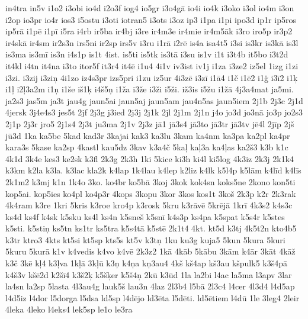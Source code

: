 {{in4tra in5v i1o2 i3obi io4d i2o3f iog4 io5gr i3o4g\={a} io4i io4k
i3oko i3ol io4m i3on i2op io3pr io4r ios3 i5ostu i3oti iotran5 i3ots
i3oz ip3 i1pa i1pi ipo3d ip1r ip5ros ip5r\={a} i1p\={e} i1p\={i}
i5ra i4rb ir5ba ir4bj i3re ir4m3e ir4mie ir4m5\={a}k i3ro iro5p
ir3p2 ir4sk\={a} ir4sm ir2s3n irs5ni ir2sp irs5v i3ru i1r\={a} i2r\={e}
is4a isa4t5 i3si is3kr is3k\={a} is3l is3ma is3m\={i} is3n i4s1p
is1t 4ist. is5ti is5tk is3t\={a} i3su is1v i1t i3t4b it5bo i3t2d it4kl
i4tn it4na i3to itor5f it3r4 it4\={e} i1u4 4i1v iv3ist iv1j i1za i3ze2
iz5el 1izg i1zi i3zi. i3zij i3zi\c{n} 4i1zo iz4s3pr izs5pri i1zu
iz5ur 4i3z\={e} i3z\={i} i1\={a}4 i1\v{c} i1\={e}2 i1\c{g} i3\={i}2
i1\c{k} i1\c{l} i2\c{l}3a2m i1\c{n} i1\v{s}e i\v{s}1\c{k}
i4\v{s}5\c{n} i1\v{z}a i3\v{z}e i3\v{z}i i5\v{z}i. i\v{z}3is
i5\v{z}u i1\v{z}\={a} 4j3a4mat ja5mi. ja2s3 jas5m ja3t jau4g
jaun5ai jaun5aj jaun5am jau4n5as jaun5iem 2j1b 2j3c 2j1d 4jersk
3j4e4s3 jes5t 2jf 2j3g j3ied 2j3j 2j1k 2jl 2j1m 2j1n j4o jo3d jo3n\={a}
jo3p jo2s3 2j1p 2j3r jro5 2j1s4 2j3t ju3ma 2j1v 2j3z j\={a}1 j\={a}3s4
j\={a}3to j\={a}3tr j\={a}3tv j\={e}4l 2j\={i}p 2j\v{s} j\={u}3d
1ka ka5be 5kad kad3r 3kajai kak3 ka3lu 3kam ka4nm ka3pa ka2pl ka4pr
kara3s 5kase ka2sp 4kastl kau5dz 3kav k3a4\v{c} 5ka\c{l} ka\c{l}3a
ka4\c{l}as ka2\v{s}3 k3b k1c 4k1d 3k4e kes3 ke2sk k3fl 2k3g 2k3h
1ki 5kice ki3h ki4l ki5log 4k3iz 2k3j 2k1k4 k3km k2la k3la. k3lac kla2k
k4lap 1k4lau k4lep k2liz k4lk k5l4p k5l\={a}m k4l\={i}d k4l\={i}s
2k1m2 k3mj k1n 1k4o 3ko. ko4br ko5b\={a} 3koj 3kok kok4sn koks5ne
2kono kon5ti kop5ai. kop5ies ko4pl ko4p3r 4kops 3kopu 3kor 3kos
kos1t 3ko\v{s} 2k3p k2r 2k3rak 4k4ram k3re 1kri 5kris k3roe kro4p k3rosk
5kru k3r\={a}v\={e} 5kr\={e}j\={a} 1kr\={i} 4k3s2 k4s3c ks4d
ks4f k4sk k5sku ks4l ks4n k5sne\v{s} k5sn\={i} k4s3p ks4pa k5spat
k5s4r k5stes k5sti. k5sti\c{n} ks5tn ks1tr ks5tra k5s4t\={a} k5st\={e}
2k1t4 4kt. kt5d k3tj 4k5t2n kto4b5 k3tr ktro3 4kts kt5si kt5sp
kts5s kt5v k3t\c{n} 1ku ku3g kuja5 5kun 5kura 5kuri 5kuru 5kur\={a}
k1v k4vedis k4vo k4v\={e} 2k3z2 1k\={a} 4k\={a}b 5k\={a}bu
3k\={a}m k4\={a}r 3k\={a}t 4k\={a}\v{z} k3\v{c} 3k\={e} k\c{l}4
k3\c{l}va 1k\c{l}\={a} 3k\c{l}\={u} k3\c{n} k4\c{n}a k\c{n}3au4
4k\v{s} k\v{s}4ap k\v{s}3au k\v{s}pulk5 k3\v{s}4p\={a}
k4\v{s}3v k\v{s}\={e}2d k2\v{s}\={i}4 k3\v{s}2\c{k}
k5\v{s}\c{k}er k5\v{s}4\c{n} 2k\={u} k3\={u}d 1la la2bi
l4ac la5ma l3apv 3lar la4sn la2sp 5lasta 4l3au4g lauk5\v{s} lau3n
4laz 2l3b4 l5b\={a} 2l3c4 l4cer 4l3d4 l4d5ap l4d5iz l4dor l5dorga
l5dsa ld5sp l4d\={e}jo ld3\={e}ta l5d\={e}ti. ld5\={e}tiem
l4d\={u} 1le 3leg4 2leir 4leka 4leko l4eks4 lek5sp le1o le3ra
}}
